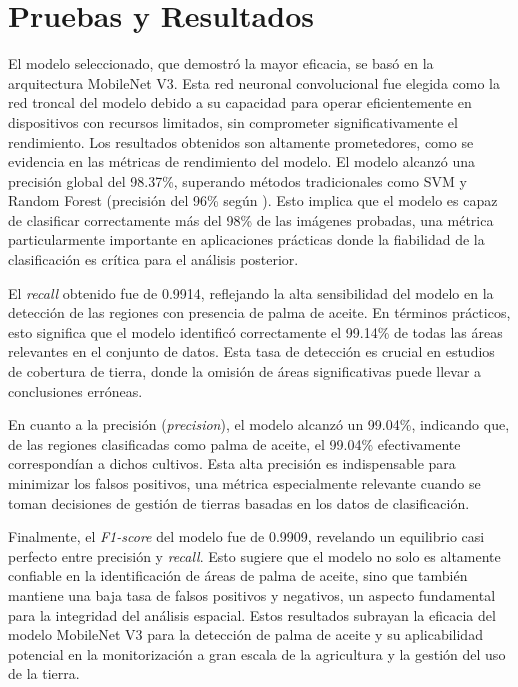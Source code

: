 \section{Pruebas y Resultados}

El modelo seleccionado, que demostró la mayor eficacia, se basó en la arquitectura MobileNet V3. Esta red neuronal convolucional fue elegida como la red troncal del modelo debido a su capacidad para operar eficientemente en dispositivos con recursos limitados, sin comprometer significativamente el rendimiento. Los resultados obtenidos son altamente prometedores, como se evidencia en las métricas de rendimiento del modelo. El modelo alcanzó una precisión global del 98.37\%, superando métodos tradicionales como SVM y Random Forest (precisión del 96\% según  \cite{diaz2023} ). Esto implica que el modelo es capaz de clasificar correctamente más del 98\% de las imágenes probadas, una métrica particularmente importante en aplicaciones prácticas donde la fiabilidad de la clasificación es crítica para el análisis posterior.

El \textit{recall} obtenido fue de 0.9914, reflejando la alta sensibilidad del modelo en la detección de las regiones con presencia de palma de aceite. En términos prácticos, esto significa que el modelo identificó correctamente el 99.14\% de todas las áreas relevantes en el conjunto de datos. Esta tasa de detección es crucial en estudios de cobertura de tierra, donde la omisión de áreas significativas puede llevar a conclusiones erróneas.

En cuanto a la precisión (\textit{precision}), el modelo alcanzó un 99.04\%, indicando que, de las regiones clasificadas como palma de aceite, el 99.04\% efectivamente correspondían a dichos cultivos. Esta alta precisión es indispensable para minimizar los falsos positivos, una métrica especialmente relevante cuando se toman decisiones de gestión de tierras basadas en los datos de clasificación.

Finalmente, el \textit{F1-score} del modelo fue de 0.9909, revelando un equilibrio casi perfecto entre precisión y \textit{recall}. Esto sugiere que el modelo no solo es altamente confiable en la identificación de áreas de palma de aceite, sino que también mantiene una baja tasa de falsos positivos y negativos, un aspecto fundamental para la integridad del análisis espacial. Estos resultados subrayan la eficacia del modelo MobileNet V3 para la detección de palma de aceite y su aplicabilidad potencial en la monitorización a gran escala de la agricultura y la gestión del uso de la tierra.

